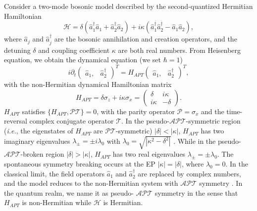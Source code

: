 \documentclass[twocolumn,prl,floatfix,citeautoscript,nofootinbib,superscriptaddress]{revtex4}
\begin{document}
\emph{%
}Consider a two-mode bosonic model described by the
second-quantized Hermitian Hamiltonian
\begin{equation}
\mathcal{H}=\delta \left( \hat{a}_{1}^{\dag }\hat{a}_{1}+\hat{a}_{2}^{\dag }%
\hat{a}_{2}\right) +i\kappa \left( \hat{a}_{1}^{\dag }\hat{a}_{2}^{\dag }-%
\hat{a}_{1}\hat{a}_{2}\right),  \label{SQH}
\end{equation}%
where $\hat{a}_{j}$ and $\hat{a}_{j}^{\dag }$ are the bosonic annihilation
and creation operators, and the detuning $\delta $ and coupling coefficient $%
\kappa $ are both real numbers. From Heisenberg equation, we obtain the
dynamical equation (we set $\hbar=1$) \cite{SM}%
\begin{equation}
i\partial _{t}\left(
\begin{array}{cc}
\hat{a}_{1}, & \hat{a}_{2}^{\dag }%
\end{array}%
\right) ^{T}=H_{APT}\left(
\begin{array}{cc}
\hat{a}_{1}, & \hat{a}_{2}^{\dag }%
\end{array}%
\right) ^{T},  \label{eq:bdg1}
\end{equation}%
with the non-Hermitian dynamical Hamiltonian matrix
\begin{equation}
H_{APT}=\delta \sigma _{z}+i\kappa \sigma _{x}=\left(
\begin{array}{cc}
\delta & i\kappa \\
i\kappa & -\delta%
\end{array}%
\right) .
\end{equation}%
$H_{APT}$ satisfies $\{H_{APT},\mathcal{PT}\}=0$, with the parity operator $%
\mathcal{P}=\sigma _{x}$ and the time-reversal complex conjugate operator $%
\mathcal{T}$. In the pseudo-$\mathcal{APT}$-symmetric region (\textit{i.e.},
the eigenstates of $H_{APT}$ are $\mathcal{PT}$-symmetric) $|\delta
|<|\kappa |$, $H_{APT}$ has two imaginary eigenvalues $\lambda _{\pm }=\pm
i\lambda _{0}$ with $\lambda _{0}=\sqrt{|\kappa ^{2}-\delta ^{2}|}$ \cite{SM}%
. While in the pseudo-$\mathcal{APT}$-broken region $|\delta |>|\kappa |$, $%
H_{APT}$ has two real eigenvalues $\lambda _{\pm }=\pm \lambda _{0}$. The
spontaneous symmetry breaking occurs at the EP $|\kappa |=|\delta |$, where $%
\lambda _{0}=0$. In the classical limit, the field operators $\hat{a}_{1}$
and $\hat{a}_{2}^{\dag }$ are replaced by complex numbers, and the model
reduces to the non-Hermitian system with $\mathcal{APT}$ symmetry \cite%
{NJP.18, PhysRevLett.123.193604}. In the quantum realm, we name it as pseudo-%
$\mathcal{APT}$ symmetry in the sense that $H_{APT}$ is non-Hermitian while $%
\mathcal{H}$ is Hermitian.
\end{document}
